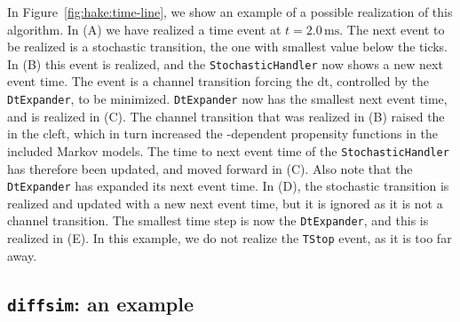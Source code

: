 In Figure~\ref{fig:hake:time-line}, we show an example of a possible
realization of this algorithm. In (A) we have realized a
time event at $t=2.0\,\mathrm{ms}$. The next event to be realized is a
stochastic transition, the one with smallest value below the ticks. In
(B) this event is realized, and the \texttt{StochasticHandler}
now shows a new next event time. The event is a channel transition
forcing the dt, controlled by the \texttt{DtExpander}, to be
minimized. \texttt{DtExpander} now has the smallest next event time,
and is realized in (C). The channel transition that was
realized in (B) raised the \CaC in the cleft, which in turn
increased the \Ca-dependent propensity functions in the included
Markov models. The time to next event time of the
\texttt{StochasticHandler} has therefore been updated, and moved
forward in (C). Also note that the \texttt{DtExpander} has
expanded its next event time. In (D), the stochastic transition
is realized and updated with a new next event time, but it is ignored
as it is not a channel transition. The smallest time step is now the
\texttt{DtExpander}, and this is realized in (E). In this
example, we do not realize the \texttt{TStop} event, as it is too far
away.

\subsection{\texttt{diffsim}: an example}
 

